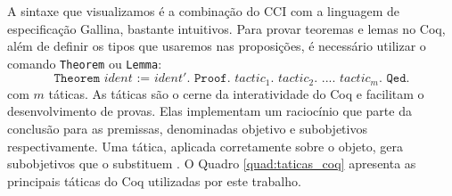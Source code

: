 A sintaxe que visualizamos é a combinação do CCI com a linguagem de especificação Gallina, bastante intuitivos. Para provar teoremas e lemas no Coq, além de definir os tipos que usaremos nas proposições, é necessário utilizar o comando \texttt{Theorem} ou \texttt{Lemma}: $$\texttt{Theorem $ident$ := $ident'$. Proof. $tactic_1$. $tactic_2$. $...$. $tactic_m$. Qed.}$$ com $m$ táticas. As táticas são o cerne da interatividade do Coq e facilitam o desenvolvimento de provas. Elas implementam um raciocínio que parte da conclusão para as premissas, denominadas objetivo e subobjetivos respectivamente. Uma tática, aplicada corretamente sobre o objeto, gera subobjetivos que o substituem \cite{manualcoq}. O Quadro \ref{quad:taticas_coq} apresenta as principais táticas do Coq utilizadas por este trabalho.



